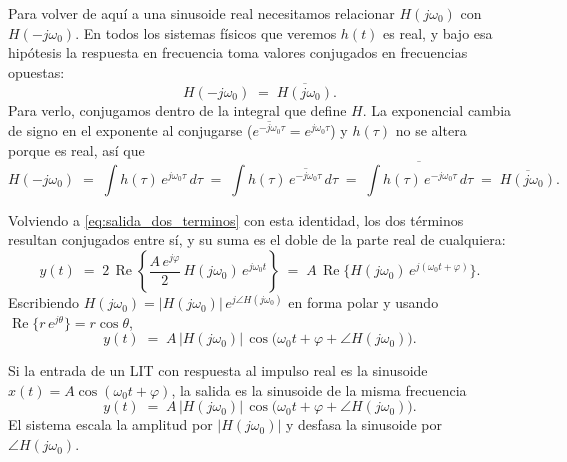 \documentclass[class=book, crop=false]{standalone}
\begin{document}
Para volver de aquí a una sinusoide real necesitamos relacionar $H(j\omega_0)$ con $H(-j\omega_0)$. En todos los sistemas físicos que veremos $h(t)$ es real, y bajo esa hipótesis la respuesta en frecuencia toma valores conjugados en frecuencias opuestas:
\begin{equation*}
    H(-j\omega_0) \;=\; \overline{H(j\omega_0)}.
\end{equation*}
Para verlo, conjugamos dentro de la integral que define $H$. La exponencial cambia de signo en el exponente al conjugarse ($\overline{e^{-j\omega_0\tau}} = e^{j\omega_0\tau}$) y $h(\tau)$ no se altera porque es real, así que
\begin{equation*}
    H(-j\omega_0) \;=\; \int h(\tau)\,e^{j\omega_0\tau}\,d\tau
                  \;=\; \int h(\tau)\,\overline{e^{-j\omega_0\tau}}\,d\tau
                  \;=\; \overline{\int h(\tau)\,e^{-j\omega_0\tau}\,d\tau}
                  \;=\; \overline{H(j\omega_0)}.
\end{equation*}

Volviendo a \eqref{eq:salida_dos_terminos} con esta identidad, los dos términos resultan conjugados entre sí, y su suma es el doble de la parte real de cualquiera:
\begin{equation*}
    y(t) \;=\; 2\,\operatorname{Re}\!\left\{\frac{A\,e^{j\varphi}}{2}\,H(j\omega_0)\,e^{j\omega_0 t}\right\}
         \;=\; A\,\operatorname{Re}\bigl\{H(j\omega_0)\,e^{j(\omega_0 t + \varphi)}\bigr\}.
\end{equation*}
Escribiendo $H(j\omega_0) = |H(j\omega_0)|\,e^{j\angle H(j\omega_0)}$ en forma polar y usando $\operatorname{Re}\{r\,e^{j\theta}\} = r\cos\theta$,
\begin{equation*}
    y(t) \;=\; A\,|H(j\omega_0)|\,\cos\bigl(\omega_0 t + \varphi + \angle H(j\omega_0)\bigr).
\end{equation*}

\begin{resultado}
Si la entrada de un LIT con respuesta al impulso real es la sinusoide
$x(t) = A\cos(\omega_0 t + \varphi)$, la salida es la sinusoide de la misma frecuencia
\begin{equation}
    y(t) \;=\; A\,|H(j\omega_0)|\,\cos\bigl(\omega_0 t + \varphi + \angle H(j\omega_0)\bigr).
    \label{eq:rsp}
\end{equation}
El sistema escala la amplitud por $|H(j\omega_0)|$ y desfasa la sinusoide por $\angle H(j\omega_0)$.
\end{resultado}
\end{document}
